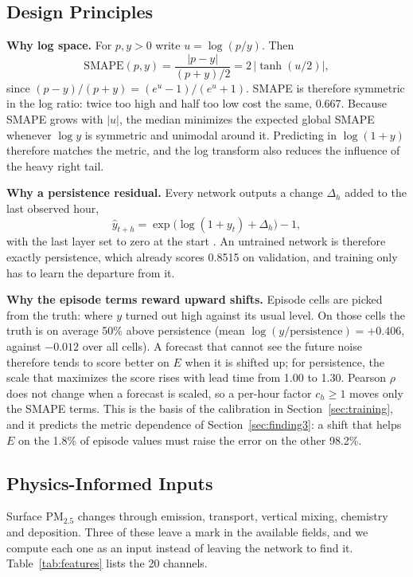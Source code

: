\documentclass[journal]{IEEEtran}
\newcommand{\PM}{PM$_{2.5}$}
\begin{document}
\subsection{Design Principles}
\label{sec:theory}
\textbf{Why log space.} For $p,y>0$ write $u=\log(p/y)$. Then
\begin{equation}
\mathrm{SMAPE}(p,y) = \frac{|p-y|}{(p+y)/2} = 2\,\bigl|\tanh(u/2)\bigr|,
\end{equation}
since $(p-y)/(p+y)=(e^u-1)/(e^u+1)$. SMAPE is therefore symmetric in the log ratio: twice too high and half too low cost the same, 0.667. Because SMAPE grows with $|u|$, the median minimizes the expected global SMAPE whenever $\log y$ is symmetric and unimodal around it. Predicting in $\log(1+y)$ therefore matches the metric, and the log transform also reduces the influence of the heavy right tail.

\textbf{Why a persistence residual.} Every network outputs a change $\Delta_h$ added to the last observed hour,
\begin{equation}
\hat{y}_{t+h} = \exp\bigl(\log(1+y_t) + \Delta_h\bigr) - 1,
\end{equation}
with the last layer set to zero at the start \cite{he2016}. An untrained network is therefore exactly persistence, which already scores 0.8515 on validation, and training only has to learn the departure from it.

\textbf{Why the episode terms reward upward shifts.} Episode cells are picked from the truth: where $y$ turned out high against its usual level. On those cells the truth is on average 50\% above persistence (mean $\log(y/\text{persistence})=+0.406$, against $-0.012$ over all cells). A forecast that cannot see the future noise therefore tends to score better on $E$ when it is shifted up; for persistence, the scale that maximizes the score rises with lead time from 1.00 to 1.30. Pearson $\rho$ does not change when a forecast is scaled, so a per-hour factor $c_h\ge1$ moves only the SMAPE terms. This is the basis of the calibration in Section~\ref{sec:training}, and it predicts the metric dependence of Section~\ref{sec:finding3}: a shift that helps $E$ on the 1.8\% of episode values must raise the error on the other 98.2\%.

\subsection{Physics-Informed Inputs}
\label{sec:physics}
Surface \PM{} changes through emission, transport, vertical mixing, chemistry and deposition. Three of these leave a mark in the available fields, and we compute each one as an input instead of leaving the network to find it. Table~\ref{tab:features} lists the 20 channels.
\end{document}
